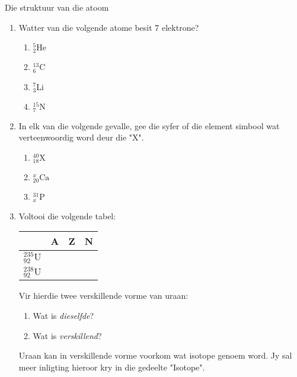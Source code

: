 \begin{exercises}{Die struktuur van die atoom}
\begin{enumerate}[noitemsep, label=\textbf{\arabic*}. ]
\begin{enumerate}[noitemsep, label=\textbf{\alph*}. ]
            \item protone
\item neutrone
\item elektrone
\end{enumerate}
... in die atoom.\newline
\item Watter van die volgende atome besit 7 elektrone?
\begin{enumerate}[noitemsep, label=\textbf{\alph*}. ] 
            \item $_{2}^{5}\text{He}$
\item $_{6}^{13}\text{C}$
\item $_{3}^{7}\text{Li}$
\item $_{7}^{15}\text{N}$
\end{enumerate}
                \item 
In elk van die volgende gevalle, gee die syfer of die element simbool wat verteenwoordig word deur die "X".
\begin{enumerate}[noitemsep, label=\textbf{\alph*}. ] 
            \item $_{18}^{40}\text{X}$
\item $_{20}^{x}\text{Ca}$
\item $_{x}^{31}\text{P}$
\end{enumerate}
                \item 
Voltooi die volgende tabel:
          \begin{table}[H]
        \begin{center}
      
    \noindent
      \begin{tabular}{|l|l|l|l|}\hline
         &
        \textbf{A} &
        \textbf{Z} &
        \textbf{N} \\ \hline
        $_{92}^{235}\text{U}$ &
         &
         &
        \\ \hline
        $_{92}^{238}\text{U}$ &
         &
         &
     \\ \hline
    \end{tabular}
      \end{center}
\end{table}
    \par
Vir hierdie twee verskillende vorme van uraan:
\begin{enumerate}[noitemsep, label=\textbf{\alph*}. ] 
            \item Wat is \textsl{dieselfde}?
\item Wat is \textsl{verskillend}?
\end{enumerate}
Uraan kan in verskillende vorme voorkom wat isotope genoem word. Jy sal meer inligting hieroor kry in die gedeelte "Isotope".
\end{enumerate}
  

\end{exercises}
